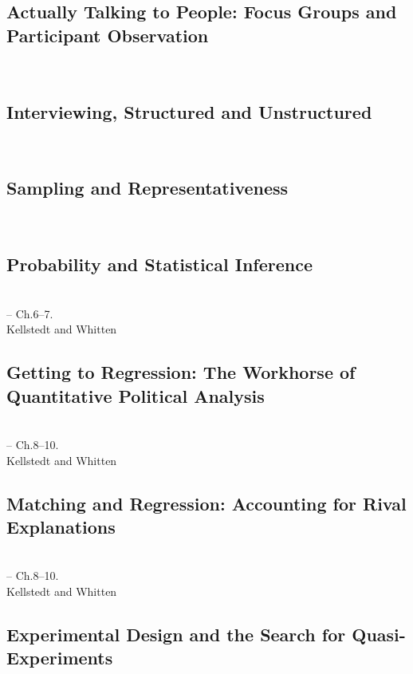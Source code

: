 \documentclass[12pt,a4paper]{article}
\newcommand{\lecture}[3][\DefaultOpt]{%
  \def\DefaultOpt{#2}%
  \clearpage\subsection[#1]{#2}\emph{#3}\vspace{.25em}\\
}
\newcommand{\reading}[2][]{\noindent -- {#1}\bibentry{#2}.\vspace{.25em}\\}
\newcommand{\textbook}[2][]{\noindent -- {#1}#2.\vspace{.25em}\\}
\begin{document}
\lecture{Actually Talking to People: Focus Groups and Participant Observation}{}


\lecture{Interviewing, Structured and Unstructured}{}

\lecture{Sampling and Representativeness}{}

\lecture{Probability and Statistical Inference}{}
\textbook{Ch.6--7}{Kellstedt and Whitten}

\lecture{Getting to Regression: The Workhorse of Quantitative Political Analysis}{} 
\textbook{Ch.8--10}{Kellstedt and Whitten}

\lecture{Matching and Regression: Accounting for Rival Explanations}{}
\textbook{Ch.8--10}{Kellstedt and Whitten}


\lecture{Experimental Design and the Search for Quasi-Experiments}{}


\end{document}
